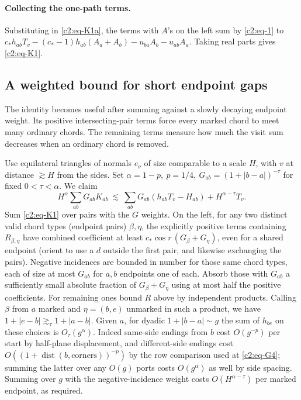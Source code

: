 \paragraph{Collecting the one-path terms.}
Substituting in \eqref{c2:eq-K1a}, the terms with \(A\)'s on the left sum by \eqref{c2:eq-1} to \(c_*h_{ab}T_v-(c_*-1)h_{ab}(A_a+A_b)-u_{ba}A_b-u_{ab}A_a\). Taking real parts gives \eqref{c2:eq-K1}.

\subsection{A weighted bound for short endpoint gaps}
The identity becomes useful after summing against a slowly decaying
endpoint weight. Its positive intersecting-pair terms force every marked
chord to meet many ordinary chords. The remaining terms measure how much
the visit sum decreases when an ordinary chord is removed.

Use equilateral triangles of normals \(e_\nu\) of size comparable to a scale \(H\), with \(v\) at distance \(\gtrsim H\) from the sides. Set \(\alpha=1-p,\ p=1/4,\ G_{ab}=(1+|b-a|)^{-\tau}\) for fixed \(0<\tau<\alpha\). We claim
\begin{equation}
 H^\alpha\sum_{ab}G_{ab}K_{ab}
 \ \lesssim\ \sum_{ab} G_{ab}(h_{ab}T_v-H_{ab})
          + H^{\alpha-\tau} T_v.                                         \label{c2:eq-K2}
\end{equation}
Sum \eqref{c2:eq-K1} over pairs with the \(G\) weights. On the left, for any two distinct valid chord types (endpoint pairs) \(\beta,\eta\), the explicitly positive terms containing \(R_{\beta,\eta}\) have combined coefficient at least \(c_*\cos r\,(G_\beta+G_\eta)\), even for a shared endpoint (orient to use a \(d\) outside the first pair, and likewise exchanging the pairs). Negative incidences are bounded in number for those same chord types, each of size at most \(G_{ab}\) for \(a,b\) endpoints one of each. Absorb those with \(G_{ab}\) a sufficiently small absolute fraction of \(G_\beta+G_\eta\) using at most half the positive coefficients. For remaining ones bound \(R\) above by independent products. Calling \(\beta\) from \(a\) marked and \(\eta=(b,e)\) unmarked in such a product, we have \(1+|e-b|\gtrsim_\tau 1+|a-b|\). Given \(a\), for dyadic \(1+|b-a|\sim g\) the sum of \(h_{be}\) on these choices is \(O_\tau(g^\alpha)\). Indeed same-side endings from \(b\) cost \(O(g^{-p})\) per start by half-plane displacement, and different-side endings cost \(O((1+\operatorname{dist}(b,\text{corners}))^{-p})\) by the row comparison used at \eqref{c2:eq-G4}; summing the latter over any \(O(g)\) ports costs \(O(g^\alpha)\) as well by side spacing. Summing over \(g\) with the negative-incidence weight costs \(O(H^{\alpha-\tau})\) per marked endpoint, as required.

